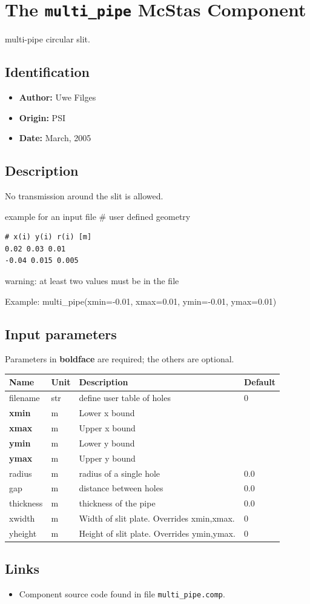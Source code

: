 \section{The \texttt{multi\_pipe} McStas Component}
multi-pipe circular slit.

\subsection*{Identification}
\begin{itemize}
  \item \textbf{Author:} Uwe Filges
  \item \textbf{Origin:} PSI
  \item \textbf{Date:} March, 2005
\end{itemize}

\subsection*{Description}
No transmission around the slit is allowed.

example for an input file \# user defined geometry

\begin{verbatim}
# x(i) y(i) r(i) [m]
0.02 0.03 0.01
-0.04 0.015 0.005
\end{verbatim}

warning: at least two values must be in the file

Example: multi\_pipe(xmin=-0.01, xmax=0.01, ymin=-0.01, ymax=0.01)

\subsection*{Input parameters}
Parameters in \textbf{boldface} are required; the others are optional.

\begin{longtable}{p{}p{}p{}p{}}
\toprule
\textbf{Name} & \textbf{Unit} & \textbf{Description} & \textbf{Default} \\
\midrule
\endhead
filename & str & define user table of holes & 0 \\
\textbf{xmin} & m & Lower x bound &  \\
\textbf{xmax} & m & Upper x bound &  \\
\textbf{ymin} & m & Lower y bound &  \\
\textbf{ymax} & m & Upper y bound &  \\
radius & m & radius of a single hole & 0.0 \\
gap & m & distance between holes & 0.0 \\
thickness & m & thickness of the pipe & 0.0 \\
xwidth & m & Width of slit plate. Overrides xmin,xmax. & 0 \\
yheight & m & Height of slit plate. Overrides ymin,ymax. & 0 \\
\bottomrule
\end{longtable}

\subsection*{Links}
\begin{itemize}
  \item Component source code found in file \texttt{multi\_pipe.comp}.
\end{itemize}
